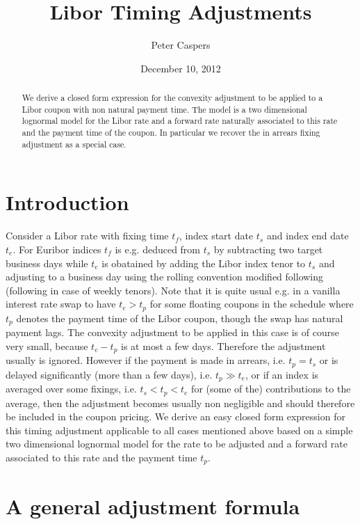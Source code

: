 \documentclass{amsart}
\theoremstyle{plain}
\numberwithin{equation}{section}
\begin{document}
\title[Libor Timing Adjustments]{Libor Timing Adjustments}
\author{Peter Caspers}
\date{December 10, 2012}
\begin{abstract}
We derive a closed form expression for the convexity adjustment to be applied to a Libor coupon with non natural
payment time. The model is a two dimensional lognormal model for the Libor rate and a forward rate
naturally associated to this rate and the payment time of the coupon. In particular we recover the in arrears
fixing adjustment as a special case.
\end{abstract}

\maketitle

\section{Introduction}

Consider a Libor rate with fixing time $t_f$, index start date $t_s$ and index end date $t_e$. For Euribor indices
$t_f$ is e.g. deduced from $t_s$ by subtracting two target business days while $t_e$ is obatained by adding
the Libor index tenor to $t_s$ and adjusting to a business day using the rolling convention modified following (following in case of weekly tenors).
Note that it is quite usual e.g. in a vanilla interest rate swap to have $t_e > t_p$ for some floating coupons in the schedule where $t_p$ denotes the payment
time of the Libor coupon, though the swap has natural payment lags. The convexity adjustment to be applied in this case
is of course very small, because $t_e - t_p$ is at most a few days. Therefore the adjustment usually is ignored. However
if the payment is made in arrears, i.e. $t_p = t_s$ or is delayed significantly (more than a few days), i.e. $t_p \gg t_e$, or if an index is
averaged over some fixings, i.e. $t_s < t_p < t_e$ for (some of the) contributions to the average, then the adjustment
becomes usually non negligible and should therefore be included in the coupon pricing. We derive an easy closed form expression for this timing adjustment
applicable to all cases mentioned above based on a simple two dimensional lognormal model for the rate to be adjusted and a forward rate associated
to this rate and the payment time $t_p$.

\section{A general adjustment formula}
\end{document}
